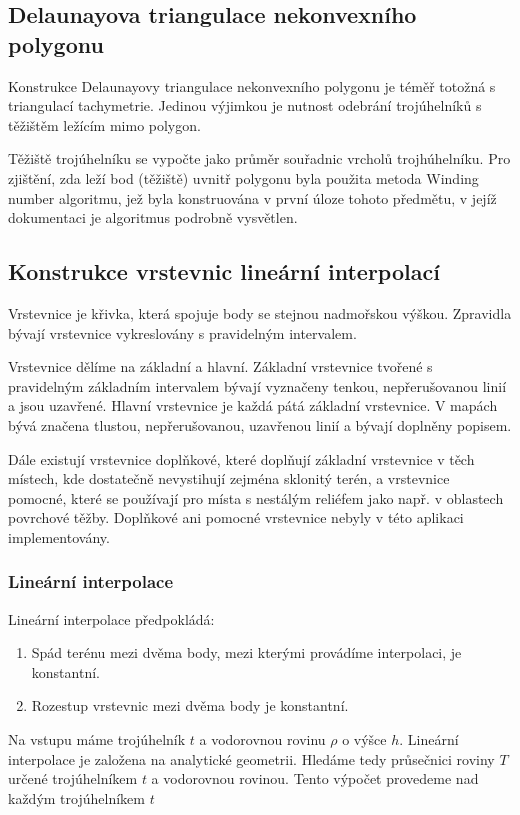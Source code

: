 \documentclass[11pt]{article}
\begin{document}
\subsection{Delaunayova triangulace nekonvexního polygonu}
Konstrukce Delaunayovy triangulace nekonvexního polygonu je téměř totožná s triangulací tachymetrie. Jedinou výjimkou je nutnost odebrání trojúhelníků s těžištěm ležícím mimo polygon. 

Těžiště trojúhelníku se vypočte jako průměr souřadnic vrcholů trojhúhelníku. Pro zjištění, zda leží bod (těžiště) uvnitř polygonu byla použita metoda Winding number algoritmu, jež byla konstruována v první úloze tohoto předmětu, v jejíž dokumentaci je algoritmus podrobně vysvětlen.

\subsection{Konstrukce vrstevnic lineární interpolací}
Vrstevnice je křivka, která spojuje body se stejnou nadmořskou výškou. Zpravidla bývají vrstevnice vykreslovány s pravidelným intervalem.

Vrstevnice dělíme na základní a hlavní. Základní vrstevnice tvořené s pravidelným základním intervalem bývají vyznačeny tenkou, nepřerušovanou linií a jsou uzavřené. Hlavní vrstevnice je každá pátá základní vrstevnice. V mapách bývá značena tlustou, nepřerušovanou, uzavřenou linií a bývají doplněny popisem.

Dále existují vrstevnice doplňkové, které doplňují základní vrstevnice v těch místech, kde dostatečně nevystihují zejména sklonitý terén, a vrstevnice pomocné, které se používají pro místa s nestálým reliéfem jako např. v oblastech povrchové těžby. Doplňkové ani pomocné vrstevnice nebyly v této aplikaci implementovány.

\subsubsection{Lineární interpolace}
Lineární interpolace předpokládá:
\begin{enumerate}
\item Spád terénu mezi dvěma body, mezi kterými provádíme interpolaci, je konstantní.
\item Rozestup vrstevnic mezi dvěma body je konstantní.
\end{enumerate}

Na vstupu máme trojúhelník $t$ a vodorovnou rovinu $\rho$ o výšce $h$. Lineární interpolace je založena na analytické geometrii. Hledáme tedy průsečnici roviny $T$ určené trojúhelníkem $t$ a vodorovnou rovinou. Tento výpočet provedeme nad každým trojúhelníkem $t$
\end{document}
